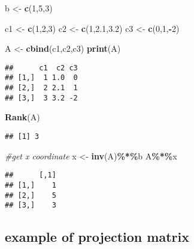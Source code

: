 \documentclass[
]{article}
\newenvironment{Shaded}{\begin{snugshade}}{\end{snugshade}}
\newcommand{\CommentTok}[1]{\textcolor[rgb]{0.56,0.35,0.01}{\textit{#1}}}
\newcommand{\DecValTok}[1]{\textcolor[rgb]{0.00,0.00,0.81}{#1}}
\newcommand{\FloatTok}[1]{\textcolor[rgb]{0.00,0.00,0.81}{#1}}
\newcommand{\FunctionTok}[1]{\textcolor[rgb]{0.13,0.29,0.53}{\textbf{#1}}}
\newcommand{\NormalTok}[1]{#1}
\newcommand{\OtherTok}[1]{\textcolor[rgb]{0.56,0.35,0.01}{#1}}
\newcommand{\SpecialCharTok}[1]{\textcolor[rgb]{0.81,0.36,0.00}{\textbf{#1}}}
\begin{document}
\begin{Shaded}
\begin{Highlighting}[]
\NormalTok{b }\OtherTok{\textless{}{-}} \FunctionTok{c}\NormalTok{(}\DecValTok{1}\NormalTok{,}\DecValTok{5}\NormalTok{,}\DecValTok{3}\NormalTok{)}

\NormalTok{c1 }\OtherTok{\textless{}{-}} \FunctionTok{c}\NormalTok{(}\DecValTok{1}\NormalTok{,}\DecValTok{2}\NormalTok{,}\DecValTok{3}\NormalTok{)}
\NormalTok{c2 }\OtherTok{\textless{}{-}} \FunctionTok{c}\NormalTok{(}\DecValTok{1}\NormalTok{,}\FloatTok{2.1}\NormalTok{,}\FloatTok{3.2}\NormalTok{)}
\NormalTok{c3 }\OtherTok{\textless{}{-}} \FunctionTok{c}\NormalTok{(}\DecValTok{0}\NormalTok{,}\DecValTok{1}\NormalTok{,}\SpecialCharTok{{-}}\DecValTok{2}\NormalTok{)}

\NormalTok{A }\OtherTok{\textless{}{-}} \FunctionTok{cbind}\NormalTok{(c1,c2,c3)}
\FunctionTok{print}\NormalTok{(A)}
\end{Highlighting}
\end{Shaded}

\begin{verbatim}
##      c1  c2 c3
## [1,]  1 1.0  0
## [2,]  2 2.1  1
## [3,]  3 3.2 -2
\end{verbatim}

\begin{Shaded}
\begin{Highlighting}[]
\FunctionTok{Rank}\NormalTok{(A)}
\end{Highlighting}
\end{Shaded}

\begin{verbatim}
## [1] 3
\end{verbatim}

\begin{Shaded}
\begin{Highlighting}[]
\CommentTok{\#get x coordinate}
\NormalTok{x }\OtherTok{\textless{}{-}} \FunctionTok{inv}\NormalTok{(A)}\SpecialCharTok{\%*\%}\NormalTok{b}
\NormalTok{A}\SpecialCharTok{\%*\%}\NormalTok{x}
\end{Highlighting}
\end{Shaded}

\begin{verbatim}
##      [,1]
## [1,]    1
## [2,]    5
## [3,]    3
\end{verbatim}

\hypertarget{example-of-projection-matrix}{%
\subsection{example of projection
matrix}\label{example-of-projection-matrix}}
\end{document}
